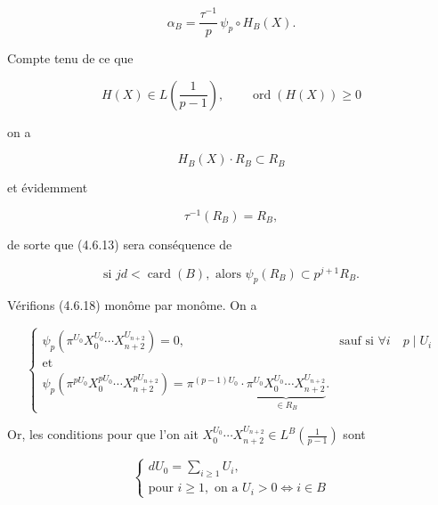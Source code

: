 \begin{equation}\tag{4.6.14}
\alpha_B=\frac{\tau^{-1}}p\,\psi_p\circ H_B(X).
\end{equation}

Compte tenu de ce que

\begin{equation}\tag{4.6.15}
H(X)\in L\!\left(\frac1{p-1}\right),
\qquad \operatorname{ord}(H(X))\geq0
\end{equation}

on a

\begin{equation}\tag{4.6.16}
H_B(X)\cdot R_B\subset R_B
\end{equation}

et évidemment

\begin{equation}\tag{4.6.17}
\tau^{-1}(R_B)=R_B,
\end{equation}


de sorte que (4.6.13) sera conséquence de

\begin{equation}\tag{4.6.18}
\text{si }jd<\operatorname{card}(B),\text{ alors }
\psi_p(R_B)\subset p^{j+1}R_B.
\end{equation}

Vérifions (4.6.18) monôme par monôme. On a

\begin{equation}\tag{4.6.19}
\begin{cases}
\psi_p\!\left(\pi^{U_0}X_0^{U_0}\cdots X_{n+2}^{U_{n+2}}\right)=0,
&\text{sauf si }\forall i\quad p\mid U_i\\
\text{et}\\[3pt]
\psi_p\!\left(
\pi^{pU_0}X_0^{pU_0}\cdots X_{n+2}^{pU_{n+2}}
\right)
=\pi^{(p-1)U_0}\cdot
\underbrace{\pi^{U_0}X_0^{U_0}\cdots X_{n+2}^{U_{n+2}}}_{\in R_B}.
\end{cases}
\end{equation}

Or, les conditions pour que l'on ait
$X_0^{U_0}\cdots X_{n+2}^{U_{n+2}}
\in L^B\!\left(\frac1{p-1}\right)$ sont

\begin{equation}\tag{4.6.20}
\begin{cases}
dU_0=\displaystyle\sum_{i\geq1}U_i,\\
\text{pour }i\geq1,\text{ on a }U_i>0\Longleftrightarrow i\in B
\end{cases}
\end{equation}

